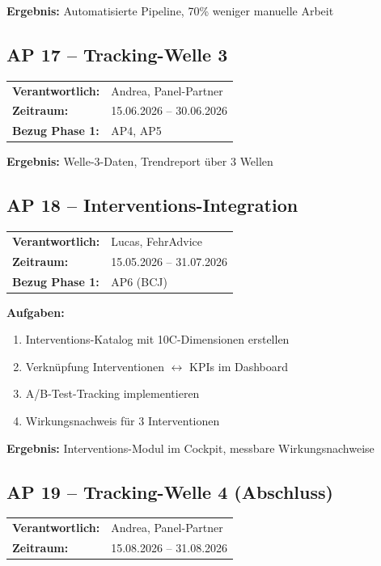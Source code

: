 \documentclass[11pt,a4paper]{article}
\begin{document}
\textbf{Ergebnis:} Automatisierte Pipeline, 70\% weniger manuelle Arbeit

\subsection{AP 17 -- Tracking-Welle 3}

\begin{tabular}{ll}
\textbf{Verantwortlich:} & Andrea, Panel-Partner\\
\textbf{Zeitraum:} & 15.06.2026 -- 30.06.2026\\
\textbf{Bezug Phase 1:} & AP4, AP5\\
\end{tabular}

\textbf{Ergebnis:} Welle-3-Daten, Trendreport über 3 Wellen

\subsection{AP 18 -- Interventions-Integration}

\begin{tabular}{ll}
\textbf{Verantwortlich:} & Lucas, FehrAdvice\\
\textbf{Zeitraum:} & 15.05.2026 -- 31.07.2026\\
\textbf{Bezug Phase 1:} & AP6 (BCJ)\\
\end{tabular}

\textbf{Aufgaben:}
\begin{enumerate}[label=AP18.\arabic*]
    \item Interventions-Katalog mit 10C-Dimensionen erstellen
    \item Verknüpfung Interventionen $\leftrightarrow$ KPIs im Dashboard
    \item A/B-Test-Tracking implementieren
    \item Wirkungsnachweis für 3 Interventionen
\end{enumerate}

\textbf{Ergebnis:} Interventions-Modul im Cockpit, messbare Wirkungsnachweise

\subsection{AP 19 -- Tracking-Welle 4 (Abschluss)}

\begin{tabular}{ll}
\textbf{Verantwortlich:} & Andrea, Panel-Partner\\
\textbf{Zeitraum:} & 15.08.2026 -- 31.08.2026\\
\end{tabular}
\end{document}
